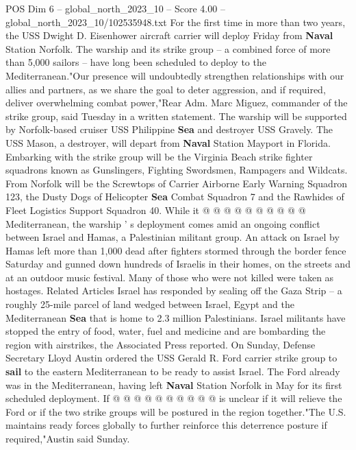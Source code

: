 \begin{textsample}{POS Dim 6 – global\_north\_2023\_10 – Score 4.00 – global\_north\_2023\_10/102535948.txt}  \label{ex:f6_pos_249}
For the first time in more than two years, the USS Dwight D.
Eisenhower aircraft carrier will deploy Friday from \textbf{Naval} Station Norfolk.
The warship and its strike group -- a combined force of more than 5,000 sailors -- have long been scheduled to deploy to the Mediterranean."Our presence will undoubtedly strengthen relationships with our allies and partners, as we share the goal to deter aggression, and if required, deliver overwhelming combat power,"Rear Adm.
Marc Miguez, commander of the strike group, said Tuesday in a written statement.
The warship will be supported by Norfolk-based cruiser USS Philippine \textbf{Sea} and destroyer USS Gravely.
The USS Mason, a destroyer, will depart from \textbf{Naval} Station Mayport in Florida.
Embarking with the strike group will be the Virginia Beach strike fighter squadrons known as Gunslingers, Fighting Swordsmen, Rampagers and Wildcats.
From Norfolk will be the Screwtops of Carrier Airborne Early Warning Squadron 123, the Dusty Dogs of Helicopter \textbf{Sea} Combat Squadron 7 and the Rawhides of Fleet Logistics Support Squadron 40.
While it @ @ @ @ @ @ @ @ @ @ Mediterranean, the warship ' s deployment comes amid an ongoing conflict between Israel and Hamas, a Palestinian militant group.
An attack on Israel by Hamas left more than 1,000 dead after fighters stormed through the border fence Saturday and gunned down hundreds of Israelis in their homes, on the streets and at an outdoor music festival.
Many of those who were not killed were taken as hostages.
Related Articles Israel has responded by sealing off the Gaza Strip -- a roughly 25-mile parcel of land wedged between Israel, Egypt and the Mediterranean \textbf{Sea} that is home to 2.3 million Palestinians.
Israel militants have stopped the entry of food, water, fuel and medicine and are bombarding the region with airstrikes, the Associated Press reported.
On Sunday, Defense Secretary Lloyd Austin ordered the USS Gerald R.
Ford carrier strike group to \textbf{sail} to the eastern Mediterranean to be ready to assist Israel.
The Ford already was in the Mediterranean, having left \textbf{Naval} Station Norfolk in May for its first scheduled deployment.
If @ @ @ @ @ @ @ @ @ @ is unclear if it will relieve the Ford or if the two strike groups will be postured in the region together."The U.S. maintains ready forces globally to further reinforce this deterrence posture if required,"Austin said Sunday.

\end{textsample}
